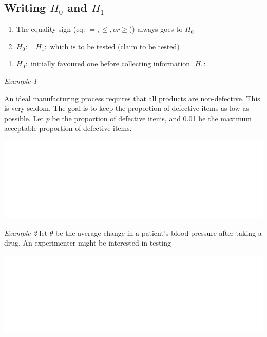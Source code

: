 \documentclass[]{book}
\providecommand{\tightlist}{%
  \setlength{\itemsep}{0pt}\setlength{\parskip}{0pt}}
\begin{document}
\hypertarget{writing-h_0-and-h_1}{%
\subsection{\texorpdfstring{Writing \(H_0\) and \(H_1\)}{Writing H\_0 and H\_1}}\label{writing-h_0-and-h_1}}

\begin{enumerate}
\def\labelenumi{\arabic{enumi}.}
\item
  The equality sign (eq: \(=,\leq, or \geq\))) always goes to \(H_0\)
\item
  \(H_0:\text{            }\) \(H_1: \text{ which is to be tested (claim to be tested})\)
\end{enumerate}

\begin{enumerate}
\def\labelenumi{\arabic{enumi}.}
\setcounter{enumi}{2}
\tightlist
\item
  \(H_0: \text{ initially favoured one before collecting information   }\) \(H_1:\)
\end{enumerate}

\newpage

\emph{Example 1}

An ideal manufacturing process requires that all products are non-defective. This is very seldom. The goal is to keep the proportion of defective items as low as possible. Let \(p\) be the proportion of defective items, and 0.01 be the maximum acceptable proportion of defective items.

\begin{center}\includegraphics[width=1\linewidth]{figure/Ch3box2-1} \end{center}

\emph{Example 2}
let \(\theta\) be the average change in a patient's blood pressure after taking a drug. An experimenter might be interested in testing

\begin{center}\includegraphics[width=1\linewidth]{figure/Ch3box3-1} \end{center}
\end{document}
